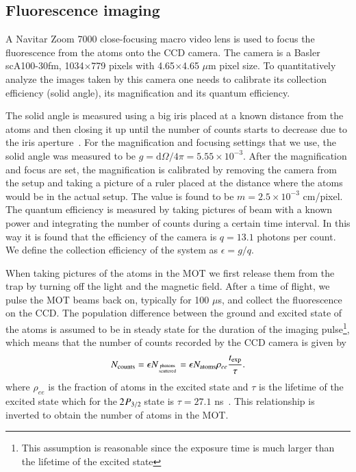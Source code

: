 \documentclass[oneside,12pt]{memoir}
\newcommand{\twop}[1]{\ensuremath{\hspace{-1pt}2\hspace{0.5pt}\hspace{0pt}P_{#1}\hspace{-1pt}}}
\begin{document}
\subsection{Fluorescence imaging}

A Navitar Zoom 7000 close-focusing macro video lens is used to focus the
fluorescence from the atoms onto the CCD camera. The camera is a Basler
scA100-30fm, 1034$\times$779 pixels with 4.65$\times$4.65 $\mu$m pixel size.   To
quantitatively analyze the images taken by this camera one needs to calibrate
its collection efficiency (solid angle), its magnification and its quantum
efficiency.    

The solid angle is measured using a big iris placed at a known distance from
the atoms and then closing it up until the number of counts starts to decrease
due to the iris aperture~\cite{Junker2007}.  For the magnification and focusing
settings that we use, the solid angle was measured to be
$g=\mathrm{d}\Omega/4\pi=5.55\times10^{-3}$.  After the magnification and focus
are set, the magnification is calibrated by removing the camera from the setup
and taking a picture of a ruler placed at the distance where the atoms would be
in the actual setup.  The value is found to be $m=2.5\times10^{-3}$ cm/pixel.
The quantum efficiency is measured by taking pictures of beam with a known
power and integrating the number of counts during a certain time interval.  In
this way it is found that the efficiency of the camera is $q=13.1$ photons per
count.  We define the collection efficiency of the system as  $\epsilon= g/q$.

When taking pictures of the atoms in the MOT we first release them from the
trap by turning off the light and the magnetic field.  After a time of flight,
we pulse the MOT beams back on, typically for 100 $\mu$s,  and collect the
fluorescence on the CCD.   The population difference between the ground and
excited state of the atoms is assumed to be in steady state for the duration of
the imaging pulse\footnote{This assumption is reasonable since the exposure
time is much larger than the lifetime of the excited state}, which means that
the number of counts recorded by the CCD camera is given by \[
N_{\mathrm{counts}} = \epsilon N_{\mathrm{photons\atop scattered}} =  \epsilon
N_{\mathrm{atoms}} \rho_{ee}\frac{t_{\mathrm{exp}}}{\tau}     .\]  where
$\rho_{ee}$ is the fraction of atoms in the excited state and $\tau$ is the
lifetime of the excited state which for the \twop{3/2} state is $\tau = 27.1$
ns~\cite{McAlexander1996}.  This relationship is inverted to obtain the number
of atoms in the MOT.   
\end{document}
